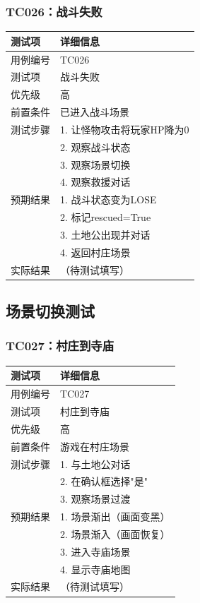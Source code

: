 \documentclass[a4paper,12pt]{article}
\begin{document}
\subsubsection{TC026：战斗失败}
\begin{table}[h]
\centering
\begin{tabular}{ll}
\toprule
测试项 & 详细信息 \\
\midrule
用例编号 & TC026 \\
测试项 & 战斗失败 \\
优先级 & 高 \\
前置条件 & 已进入战斗场景 \\
测试步骤 & 1. 让怪物攻击将玩家HP降为0 \\
 & 2. 观察战斗状态 \\
 & 3. 观察场景切换 \\
 & 4. 观察救援对话 \\
预期结果 & 1. 战斗状态变为LOSE \\
 & 2. 标记rescued=True \\
 & 3. 土地公出现并对话 \\
 & 4. 返回村庄场景 \\
实际结果 & （待测试填写） \\
\bottomrule
\end{tabular}
\end{table}

\subsection{场景切换测试}

\subsubsection{TC027：村庄到寺庙}
\begin{table}[h]
\centering
\begin{tabular}{ll}
\toprule
测试项 & 详细信息 \\
\midrule
用例编号 & TC027 \\
测试项 & 村庄到寺庙 \\
优先级 & 高 \\
前置条件 & 游戏在村庄场景 \\
测试步骤 & 1. 与土地公对话 \\
 & 2. 在确认框选择"是" \\
 & 3. 观察场景过渡 \\
预期结果 & 1. 场景渐出（画面变黑） \\
 & 2. 场景渐入（画面恢复） \\
 & 3. 进入寺庙场景 \\
 & 4. 显示寺庙地图 \\
实际结果 & （待测试填写） \\
\bottomrule
\end{tabular}
\end{table}
\end{document}
